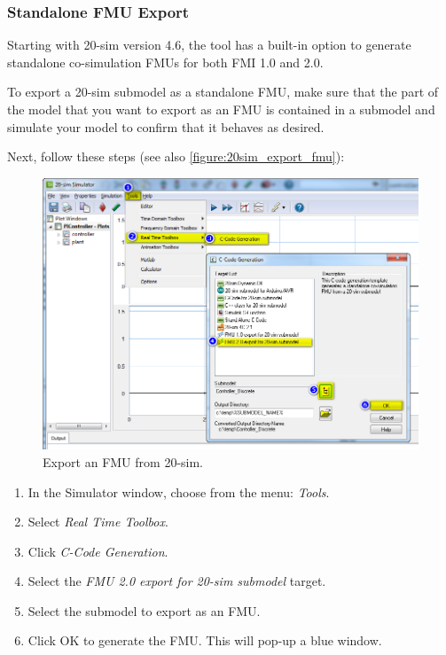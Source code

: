 %
%
%
\subsubsection{Standalone FMU Export}\label{sec:simulators:20sim:standalonefmu}
Starting with {20-sim} version 4.6, the tool has a built-in option to generate standalone co-simulation FMUs for both FMI 1.0 and 2.0.

To export a {20-sim} submodel as a standalone FMU, make sure that the part of the model that you want to export as an FMU is contained in a submodel and simulate your model to confirm that it behaves as desired.

Next, follow these steps (see also \autoref{figure:20sim_export_fmu}):
%
%
%
\begin{figure}[hbt]
	\centerline{\includegraphics[width=\textwidth]{figures/20-sim_generate_fmu.png}}
	\caption{Export an FMU from 20-sim.}
	\label{figure:20sim_export_fmu}
\end{figure}
%
%
%
\begin{enumerate}
  \item In the Simulator window, choose from the menu: \textit{Tools}.
  \item Select \textit{Real Time Toolbox}.
  \item Click \textit{C-Code Generation}.
  \item Select the \textit{FMU 2.0 export for 20-sim submodel} target. 
  \item Select the submodel to export as an FMU.
  \item Click OK to generate the FMU. This will pop-up a blue window.
\end{enumerate}
